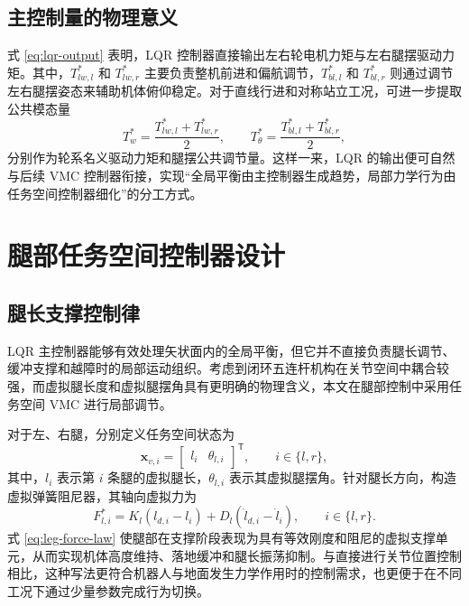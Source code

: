 \subsection{主控制量的物理意义}

式 \eqref{eq:lqr-output} 表明，LQR 控制器直接输出左右轮电机力矩与左右腿摆驱动力矩。其中，$T_{lw,l}^{\ast}$ 和 $T_{lw,r}^{\ast}$ 主要负责整机前进和偏航调节，$T_{bl,l}^{\ast}$ 和 $T_{bl,r}^{\ast}$ 则通过调节左右腿摆姿态来辅助机体俯仰稳定。对于直线行进和对称站立工况，可进一步提取公共模态量
\begin{equation}
  T_{w}^{\ast}
  =
  \frac{T_{lw,l}^{\ast} + T_{lw,r}^{\ast}}{2},
  \qquad
  T_{\theta}^{\ast}
  =
  \frac{T_{bl,l}^{\ast} + T_{bl,r}^{\ast}}{2},
  \label{eq:lqr-common-mode}
\end{equation}
分别作为轮系名义驱动力矩和腿摆公共调节量。这样一来，LQR 的输出便可自然与后续 VMC 控制器衔接，实现“全局平衡由主控制器生成趋势，局部力学行为由任务空间控制器细化”的分工方式。

\section{腿部任务空间控制器设计}

\subsection{腿长支撑控制律}

LQR 主控制器能够有效处理矢状面内的全局平衡，但它并不直接负责腿长调节、缓冲支撑和越障时的局部运动组织。考虑到闭环五连杆机构在关节空间中耦合较强，而虚拟腿长度和虚拟腿摆角具有更明确的物理含义，本文在腿部控制中采用任务空间 VMC 进行局部调节。

对于左、右腿，分别定义任务空间状态为
\begin{equation}
  \boldsymbol{x}_{v,i} =
  \begin{bmatrix}
    l_i & \theta_{l,i}
  \end{bmatrix}^{\mathsf{T}},
  \qquad i \in \{l,r\},
  \label{eq:leg-task-state}
\end{equation}
其中，$l_i$ 表示第 $i$ 条腿的虚拟腿长，$\theta_{l,i}$ 表示其虚拟腿摆角。针对腿长方向，构造虚拟弹簧阻尼器，其轴向虚拟力为
\begin{equation}
  F_{l,i}^{\ast}
  =
  K_l (l_{d,i} - l_i)
  +
  D_l (\dot{l}_{d,i} - \dot{l}_i),
  \qquad i \in \{l,r\}.
  \label{eq:leg-force-law}
\end{equation}
式 \eqref{eq:leg-force-law} 使腿部在支撑阶段表现为具有等效刚度和阻尼的虚拟支撑单元，从而实现机体高度维持、落地缓冲和腿长振荡抑制。与直接进行关节位置控制相比，这种写法更符合机器人与地面发生力学作用时的控制需求，也更便于在不同工况下通过少量参数完成行为切换。

